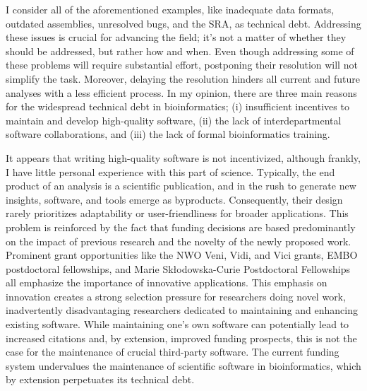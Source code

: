 I consider all of the aforementioned examples, like inadequate data formats, outdated assemblies, unresolved bugs, and the SRA, as technical debt. Addressing these issues is crucial for advancing the field; it's not a matter of whether they should be addressed, but rather how and when. Even though addressing some of these problems will require substantial effort, postponing their resolution will not simplify the task. Moreover, delaying the resolution hinders all current and future analyses with a less efficient process. In my opinion, there are three main reasons for the widespread technical debt in bioinformatics; (i) insufficient incentives to maintain and develop high-quality software, (ii) the lack of interdepartmental software collaborations, and (iii) the lack of formal bioinformatics training.

It appears that writing high-quality software is not incentivized, although frankly, I have little personal experience with this part of science. Typically, the end product of an analysis is a scientific publication, and in the rush to generate new insights, software, and tools emerge as byproducts. Consequently, their design rarely prioritizes adaptability or user-friendliness for broader applications. This problem is reinforced by the fact that funding decisions are based predominantly on the impact of previous research and the novelty of the newly proposed work. Prominent grant opportunities like the NWO Veni, Vidi, and Vici grants, EMBO postdoctoral fellowships, and Marie Skłodowska-Curie Postdoctoral Fellowships all emphasize the importance of innovative applications. This emphasis on innovation creates a strong selection pressure for researchers doing novel work, inadvertently disadvantaging researchers dedicated to maintaining and enhancing existing software. While maintaining one's own software can potentially lead to increased citations and, by extension, improved funding prospects, this is not the case for the maintenance of crucial third-party software. The current funding system undervalues the maintenance of scientific software in bioinformatics, which by extension perpetuates its technical debt.

